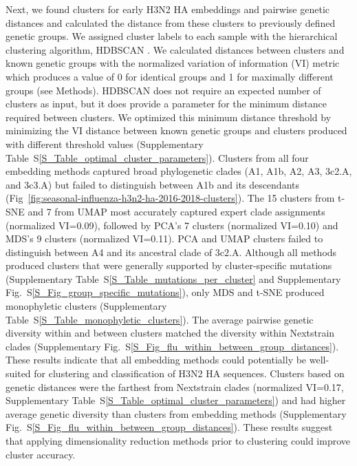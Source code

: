 \documentclass[webpdf,contemporary,large,single]{oup-authoring-template}%
\theoremstyle{thmstyleone}%
\theoremstyle{thmstyletwo}%
\theoremstyle{thmstylethree}%
\begin{document}
Next, we found clusters for early H3N2 HA embeddings and pairwise genetic distances and calculated the distance from these clusters to previously defined genetic groups.
We assigned cluster labels to each sample with the hierarchical clustering algorithm, HDBSCAN \citep{campello2015hierarchical}.
We calculated distances between clusters and known genetic groups with the normalized variation of information (VI) metric \citep{meilua2003comparing} which produces a value of 0 for identical groups and 1 for maximally different groups (see Methods).
HDBSCAN does not require an expected number of clusters as input, but it does provide a parameter for the minimum distance required between clusters.
We optimized this minimum distance threshold by minimizing the VI distance between known genetic groups and clusters produced with different threshold values (Supplementary Table~S\ref{S_Table_optimal_cluster_parameters}).
Clusters from all four embedding methods captured broad phylogenetic clades (A1, A1b, A2, A3, 3c2.A, and 3c3.A) but failed to distinguish between A1b and its descendants (Fig~\ref{fig:seasonal-influenza-h3n2-ha-2016-2018-clusters}).
The 15 clusters from t-SNE and 7 from UMAP most accurately captured expert clade assignments (normalized VI=0.09), followed by PCA's 7 clusters (normalized VI=0.10) and MDS's 9 clusters (normalized VI=0.11).
PCA and UMAP clusters failed to distinguish between A4 and its ancestral clade of 3c2.A.
Although all methods produced clusters that were generally supported by cluster-specific mutations (Supplementary Table~S\ref{S_Table_mutations_per_cluster} and Supplementary Fig.~S\ref{S_Fig_group_specific_mutations}), only MDS and t-SNE produced monophyletic clusters (Supplementary Table~S\ref{S_Table_monophyletic_clusters}).
The average pairwise genetic diversity within and between clusters matched the diversity within Nextstrain clades (Supplementary Fig.~S\ref{S_Fig_flu_within_between_group_distances}).
These results indicate that all embedding methods could potentially be well-suited for clustering and classification of H3N2 HA sequences.
Clusters based on genetic distances were the farthest from Nextstrain clades (normalized VI=0.17, Supplementary Table~S\ref{S_Table_optimal_cluster_parameters}) and had higher average genetic diversity than clusters from embedding methods (Supplementary Fig.~S\ref{S_Fig_flu_within_between_group_distances}).
These results suggest that applying dimensionality reduction methods prior to clustering could improve cluster accuracy.
\end{document}

